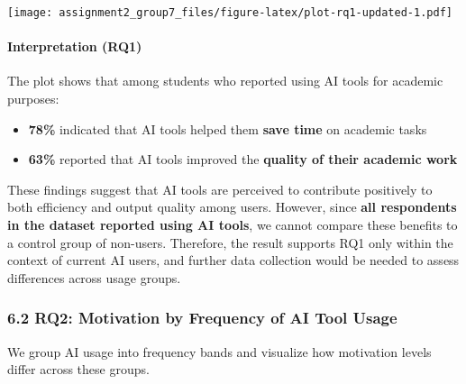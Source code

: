 \documentclass[
]{article}
\providecommand{\tightlist}{%
  \setlength{\itemsep}{0pt}\setlength{\parskip}{0pt}}
\begin{document}
\texttt{[image: assignment2\_group7\_files/figure-latex/plot-rq1-updated-1.pdf]}

\paragraph{Interpretation (RQ1)}\label{interpretation-rq1}

The plot shows that among students who reported using AI tools for
academic purposes:

\begin{itemize}
\tightlist
\item
  \textbf{78\%} indicated that AI tools helped them \textbf{save time}
  on academic tasks
\item
  \textbf{63\%} reported that AI tools improved the \textbf{quality of
  their academic work}
\end{itemize}

These findings suggest that AI tools are perceived to contribute
positively to both efficiency and output quality among users. However,
since \textbf{all respondents in the dataset reported using AI tools},
we cannot compare these benefits to a control group of non-users.
Therefore, the result supports RQ1 only within the context of current AI
users, and further data collection would be needed to assess differences
across usage groups.

\subsubsection{6.2 RQ2: Motivation by Frequency of AI Tool
Usage}\label{rq2-motivation-by-frequency-of-ai-tool-usage}

We group AI usage into frequency bands and visualize how motivation
levels differ across these groups.
\end{document}
